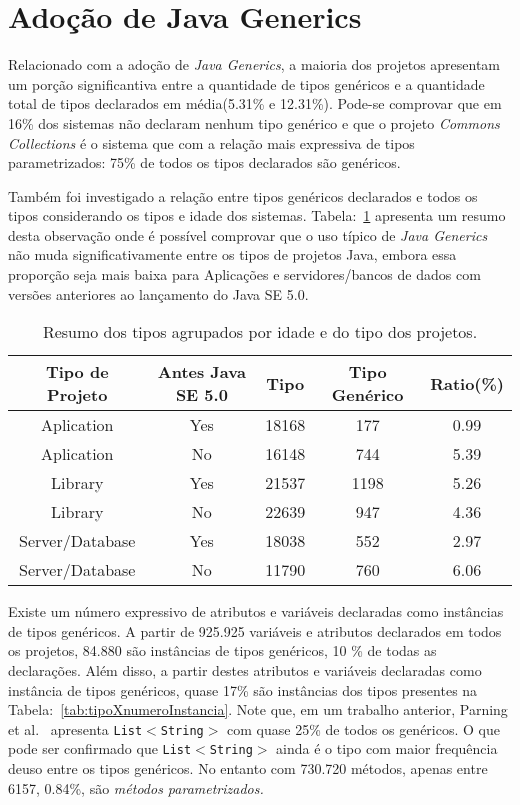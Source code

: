 \clearpage

\section{Adoção de Java Generics}
Relacionado com a adoção de \textit{Java Generics}, a maioria dos projetos apresentam um porção significantiva entre a quantidade de tipos genéricos e a quantidade total de tipos declarados em média(5.31\% e 12.31\%). Pode-se comprovar que em 16\% dos sistemas não declaram nenhum tipo genérico e que o projeto \textit{Commons Collections} é o sistema que com a relação mais expressiva de tipos parametrizados: 75\% de todos os tipos declarados são genéricos.

Também foi investigado a relação entre tipos genéricos declarados e todos os tipos considerando os tipos e idade dos sistemas. Tabela:~\ref{tab:std} apresenta um resumo desta observação onde é possível comprovar que o uso típico de  \textit{Java Generics} não muda significativamente entre os tipos de projetos Java, embora essa proporção seja mais baixa para Aplicações e servidores/bancos de dados com versões anteriores ao lançamento do Java SE 5.0.

\begin{table}[h!]
	\centering
	\caption{Resumo dos tipos agrupados por idade e do tipo dos projetos.}
	\begin{tabular}{ccccc} \hline 
		Tipo de Projeto & Antes Java SE 5.0 & Tipo & Tipo Genérico & Ratio(\%) \\ \hline\hline
		Aplication & Yes & 18168 & 177 & 0.99 \\
		Aplication & No & 16148 & 744 & 5.39 \\
		Library & Yes & 21537 & 1198 & 5.26 \\
		Library & No & 22639 & 947 & 4.36 \\
		Server/Database & Yes & 18038 & 552 & 2.97 \\ 
		Server/Database & No & 11790 & 760 & 6.06 \\ \hline
	\end{tabular}
	\label{tab:std} %
\end{table}


Existe um número expressivo de atributos e variáveis declaradas como instâncias de tipos genéricos. A partir de 925.925 variáveis e atributos declarados em todos os projetos, 84.880 são instâncias de tipos genéricos, 10 \% de todas as declarações. Além disso, a partir destes atributos e variáveis declaradas como instância de tipos genéricos, quase 17\% são instâncias dos tipos presentes na Tabela:~\ref{tab:tipoXnumeroInstancia}. Note que, em um trabalho anterior, Parning et al.~\cite{Parnin:ACM2011} apresenta \texttt{List$<$String$>$} com quase 25\% de todos os genéricos. O que pode ser confirmado que \texttt{List$<$String$>$} ainda é o tipo com maior frequência deuso entre os tipos genéricos. No entanto com 730.720 métodos, apenas entre 6157, 0.84\%, são \emph{métodos parametrizados.}

